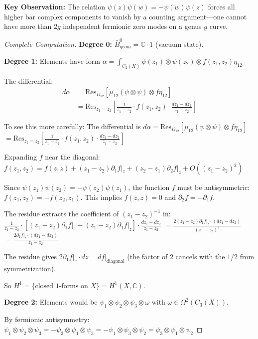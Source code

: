 \textbf{Key Observation:} The relation $\psi(z)\psi(w) = -\psi(w)\psi(z)$ forces all higher bar complex
components to vanish by a counting argument---one cannot have more than $2g$ independent
fermionic zero modes on a genus $g$ curve.

\begin{proof}[Complete Computation]
\textbf{Degree 0:} $\bar{B}^0_{geom} = \mathbb{C} \cdot 1$ (vacuum state).

\textbf{Degree 1:} Elements have form
$\alpha = \int_{C_2(X)} \psi(z_1) \otimes \psi(z_2) \otimes f(z_1,z_2)\eta_{12}$

The differential:
\begin{align}
d\alpha &= \text{Res}_{D_{12}}[\mu_{12}(\psi \otimes \psi) \otimes f\eta_{12}]\\
&= \text{Res}_{z_1=z_2}\left[\frac{1}{z_1-z_2} \cdot f(z_1,z_2) \cdot \frac{dz_1-dz_2}{z_1-z_2}\right]
\end{align}

To see this more carefully: The differential is
$d\alpha = \text{Res}_{D_{12}}[\mu_{12}(\psi \otimes \psi) \otimes f\eta_{12}]$
$= \text{Res}_{z_1=z_2}\left[\frac{1}{z_1 - z_2} \cdot f(z_1, z_2) \cdot \frac{dz_1 - dz_2}{z_1 - z_2}\right]$

Expanding $f$ near the diagonal:
$f(z_1, z_2) = f(z, z) + (z_1 - z_2)\partial_1 f|_z + (z_2 - z_1)\partial_2 f|_z + O((z_1 - z_2)^2)$

Since $\psi(z_1)\psi(z_2) = -\psi(z_2)\psi(z_1)$, the function $f$ must be antisymmetric: $f(z_1, z_2) = -f(z_2, z_1)$. This implies $f(z, z) = 0$ and $\partial_2 f = -\partial_1 f$. 

The residue extracts the coefficient of $(z_1 - z_2)^{-1}$ in:
$\frac{1}{z_1 - z_2} \cdot [(z_1 - z_2)\partial_1 f|_z - (z_1 - z_2)\partial_1 f|_z] \cdot \frac{dz_1 - dz_2}{z_1 - z_2}$
$= \frac{2(z_1 - z_2)\partial_1 f|_z \cdot (dz_1 - dz_2)}{(z_1 - z_2)^2}$
$= \frac{2\partial_1 f|_z \cdot (dz_1 - dz_2)}{z_1 - z_2}$

The residue gives $2\partial_1 f|_z \cdot dz = df|_{\text{diagonal}}$ (the factor of 2 cancels with the $1/2$ from symmetrization).

So $H^1 = \{\text{closed 1-forms on } X\} = H^1(X, \mathbb{C})$.

\textbf{Degree 2:} Elements would be $\psi_1 \otimes \psi_2 \otimes \psi_3 \otimes \omega$ with $\omega \in \Omega^2(C_3(X))$.

By fermionic antisymmetry:
$\psi_1 \otimes \psi_2 \otimes \psi_3 = -\psi_2 \otimes \psi_1 \otimes \psi_3 = -\psi_1 \otimes \psi_3 \otimes \psi_2 = \psi_3 \otimes \psi_1 \otimes \psi_2$


\end{proof}
